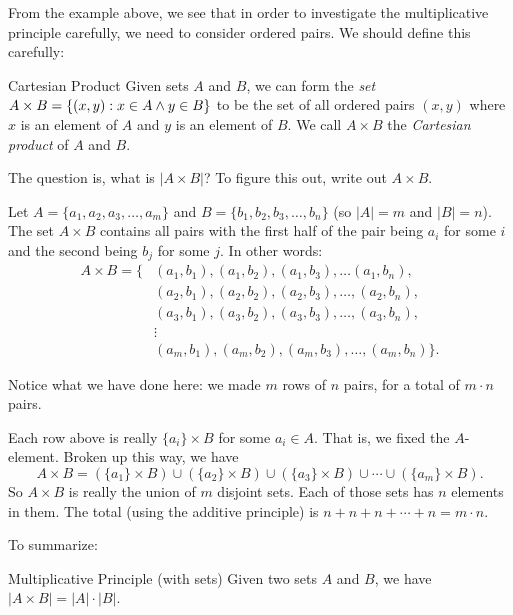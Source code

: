 \documentclass[12pt]{article}
\begin{document}
From the example above, we see that in order to investigate the multiplicative principle carefully, we need to consider ordered pairs.  We should define this carefully:

\begin{defbox}{Cartesian Product}
 Given sets $A$ and $B$, we can form the \emph{set} $A \times B = \{(x,y) : x \in A \wedge y \in B\}$ to be the set of all ordered pairs $(x,y)$ where $x$ is an element of $A$ and $y$ is an element of $B$.  We call $A \times B$ the \emph{Cartesian product} of $A$ and $B$.
\end{defbox}

The question is, what is $|A \times B|$?  To figure this out, write out $A \times B$.

Let $A = \{a_1,a_2, a_3, \ldots, a_m\}$ and $B = \{b_1,b_2, b_3, \ldots, b_n\}$  (so $|A| = m$ and $|B| = n$).  The set $A \times B$ contains all pairs with the first half of the pair being $a_i$ for some $i$ and the second being $b_j$ for some $j$.  In other words:
\begin{align*}
 A \times B = \{ & (a_1, b_1), (a_1, b_2), (a_1, b_3), \ldots (a_1, b_n), \\
  & (a_2, b_1), (a_2, b_2), (a_2, b_3), \ldots, (a_2, b_n), \\
  & (a_3, b_1), (a_3, b_2), (a_3, b_3), \ldots, (a_3, b_n), \\
  & \vdots \\
  & (a_m, b_1), (a_m, b_2), (a_m, b_3), \ldots, (a_m, b_n)\}.
\end{align*}

Notice what we have done here: we made $m$ rows of $n$ pairs, for a total of $m \cdot n$ pairs.

Each row above is really $\{a_i\} \times B$ for some $a_i \in A$.  That is, we fixed the $A$-element.  Broken up this way, we have
\[A \times B = (\{a_1\} \times B) \cup (\{a_2\} \times B) \cup (\{a_3\}\times B) \cup \cdots \cup (\{a_m\} \times B).\]
So $A \times B$ is really the union of $m$ disjoint sets.  Each of those sets has $n$ elements in them.  The total (using the additive principle) is $n + n + n + \cdots + n = m \cdot n$.

To summarize:

\begin{defbox}{Multiplicative Principle (with sets)}
 Given two sets $A$ and $B$, we have $|A \times B| = |A| \cdot |B|$.
\end{defbox}
\end{document}
